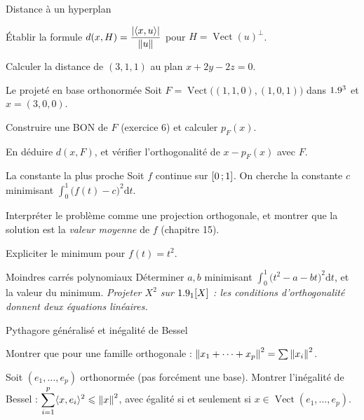 \begin{exercice}[2]{Distance à un hyperplan}
\begin{questions}
  \item Établir la formule
    $d(x,H)=\dfrac{|\langle x,u\rangle|}{\left\lVert u\right\rVert}$ pour
    $H=\operatorname{Vect}(u)^{\perp}$.
  \item Calculer la distance de $(3,1,1)$ au plan $x+2y-2z=0$.
\end{questions}
\end{exercice}

\begin{exercice}[2]{Le projeté en base orthonormée}
Soit $F=\operatorname{Vect}\bigl((1,1,0),(1,0,1)\bigr)$ dans $1.9^{3}$ et
$x=(3,0,0)$.
\begin{questions}
  \item Construire une BON de $F$ (exercice 6) et calculer $p_F(x)$.
  \item En déduire $d(x,F)$, et vérifier l'orthogonalité de $x-p_F(x)$
    avec $F$.
\end{questions}
\end{exercice}

\begin{exercice}[2]{La constante la plus proche}
Soit $f$ continue sur $\mathopen{[}0\,{;}\,1\mathclose{]}$. On cherche la constante $c$
minimisant $\displaystyle\int_{0}^{1}\bigl(f(t)-c\bigr)^{2}\mathrm{d}t$.
\begin{questions}
  \item Interpréter le problème comme une projection orthogonale, et
    montrer que la solution est la \emph{valeur moyenne} de $f$
    (chapitre 15).
  \item Expliciter le minimum pour $f(t)=t^{2}$.
\end{questions}
\end{exercice}

\begin{exercice}[2]{Moindres carrés polynomiaux}
Déterminer $a,b$ minimisant
$\displaystyle\int_{0}^{1}\bigl(t^{2}-a-bt\bigr)^{2}\mathrm{d}t$, et la
valeur du minimum. \emph{Projeter $X^{2}$ sur $1.9_1[X]$ : les conditions
d'orthogonalité donnent deux équations linéaires.}
\end{exercice}

\begin{exercice}[2]{Pythagore généralisé et inégalité de Bessel}
\begin{questions}
  \item Montrer que pour une famille orthogonale :
    $\left\lVert x_1+\dots+x_p\right\rVert^{2}=\sum\left\lVert x_i\right\rVert^{2}$.
  \item Soit $(e_1,\dots,e_p)$ orthonormée (pas forcément une base).
    Montrer l'inégalité de Bessel :
    $\displaystyle\sum_{i=1}^{p}\langle x,e_i\rangle^{2}
    \leqslant\left\lVert x\right\rVert^{2}$, avec égalité si et seulement si
    $x\in\operatorname{Vect}(e_1,\dots,e_p)$.
\end{questions}
\end{exercice}

